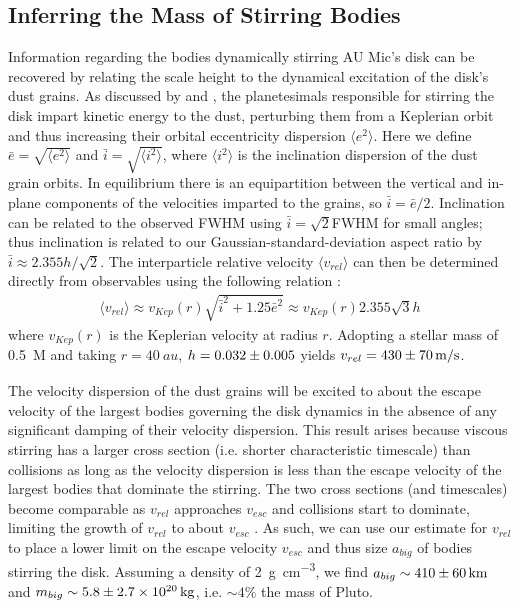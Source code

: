 \documentclass[modern]{aastex62}
\begin{document}
\subsection{Inferring the Mass of Stirring Bodies}
\label{inferring mass}

Information regarding the bodies dynamically stirring AU Mic's disk can be recovered by relating the scale height to the dynamical excitation of the disk's dust grains.
As discussed by \citet{thebault09} and \citet{quillen07}, the planetesimals responsible for stirring the disk impart kinetic energy to the dust, perturbing them from a Keplerian orbit and thus increasing their orbital eccentricity dispersion $\langle e^2 \rangle$. 
Here we define $\bar{e} = \sqrt{\langle e^2 \rangle}$ and $\bar{i} = \sqrt{\langle i^2 \rangle}$, where $\langle i^2 \rangle$ is the inclination dispersion of the dust grain orbits.
In equilibrium there is an equipartition between the vertical and in-plane components of the velocities imparted to the grains, so $\bar{i} = {\bar{e}}/{2}$.
Inclination can be related to the observed FWHM using $\bar{i} = \sqrt{2}$FWHM for small angles; thus inclination is related to our Gaussian-standard-deviation aspect ratio by $\bar{i} \approx 2.355 h / \sqrt{2}$.
The interparticle relative velocity $\langle v_{rel} \rangle$ can then be determined directly from observables using the following relation \citep{wetherill&stewart93,wyatt&dent02}:
\begin{gather}
  \langle v_{rel} \rangle \approx v_{Kep}(r) \sqrt{\bar{i}^2 + 1.25 \bar{e}^2} \approx v_{Kep}(r) 2.355 \sqrt{3} h
\end{gather}
where $v_{Kep}(r)$ is the Keplerian velocity at radius $r$. 
Adopting a stellar mass of \SI{0.5}{M_\sun} and taking $r = \SI{40}{au}$, $h=\num{0.032 \pm 0.005}$ yields $v_{rel} = \SI{430 \pm 70}{m/s}$.

The velocity dispersion of the dust grains will be excited to about the escape velocity of the largest bodies governing the disk dynamics in the absence of any significant damping of their velocity dispersion. 
This result arises because viscous stirring has a larger cross section (i.e. shorter characteristic timescale) than collisions as long as the velocity dispersion is less than the escape velocity of the largest bodies that dominate the stirring. 
The two cross sections (and timescales) become comparable as $v_{rel}$ approaches $v_{esc}$ and collisions start to dominate, limiting the growth of $v_{rel}$ to about $v_{esc}$ \citep[e.g.][]{schlichting14}.
As such, we can use our estimate for $v_{rel}$ to place a lower limit on the escape velocity $v_{esc}$ and thus size $a_{big}$ of bodies stirring the disk.
Assuming a density of \SI{2}{\g.\cm^{-3}}, we find $a_{big} \sim \SI{410 \pm 60}{km}$ and $m_{big} \sim \SI{5.8 \pm 2.7e20}{kg}$, i.e. $\sim 4\%$ the mass of Pluto.
\end{document}
